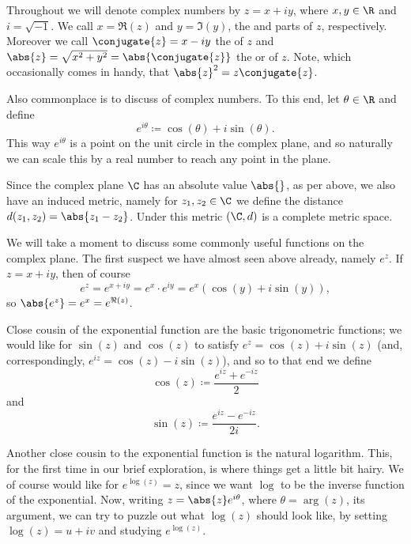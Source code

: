 


Throughout we will denote complex numbers by $z = x + i y$, where $x, y \in \R$ and $i = \sqrt{-1}$.
We call $x = \Re(z)$ and $y = \Im(y)$, the  and  parts of $z$, respectively.
Moreover we call $\conjugate{z} = x - i y$ the  of $z$ and $\abs{z} = \sqrt{x^2 + y^2} = \abs{\conjugate{z}}$ the  or  of $z$.
Note, which occasionally comes in handy, that $\abs{z}^2 = z \conjugate{z}$.

Also commonplace is to discuss  of complex numbers.
To this end, let $\theta \in \R$ and define
\[
	e^{i \theta} \coloneqq \cos(\theta) + i \sin(\theta).
\]
This way $e^{i \theta}$ is a point on the unit circle in the complex plane, and so naturally we can scale this by a real number to reach any point in the plane.

Since the complex plane $\C$ has an absolute value $\abs{}$, as per above, we also have an induced metric, namely for $z_1, z_2 \in \C$ we define the distance $d(z_1, z_2) = \abs{z_1 - z_2}$.
Under this metric $(\C, d)$ is a complete metric space.

We will take a moment to discuss some commonly useful functions on the complex plane.
The first suspect we have almost seen above already, namely $e^z$.
If $z = x + i y$, then of course
\[
	e^z = e^{x + i y} = e^x \cdot e^{i y} = e^x (\cos(y) + i \sin(y)),
\]
so $\abs{e^z} = e^x = e^{\Re(z)}$.

Close cousin of the exponential function are the basic trigonometric functions; we would like for $\sin(z)$ and $\cos(z)$ to satisfy $e^z = \cos(z) + i \sin(z)$ (and, correspondingly, $e^{i z} = \cos(z) - i \sin(z)$), and so to that end we define
\[
	\cos(z) \coloneqq \frac{e^{i z} + e^{- i z}}{2}
\]
and
\[
	\sin(z) \coloneqq \frac{e^{i z} - e^{- i z}}{2 i}.
\]

Another close cousin to the exponential function is the natural logarithm.
This, for the first time in our brief exploration, is where things get a little bit hairy.
We of course would like for $e^{\log (z)} = z$, since we want $\log$ to be the inverse function of the exponential.
Now, writing $z = \abs{z} e^{i \theta}$, where $\theta = \arg(z)$, its argument, we can try to puzzle out what $\log(z)$ should look like, by setting $\log(z) = u + i v$ and studying $e^{\log(z)}$.

